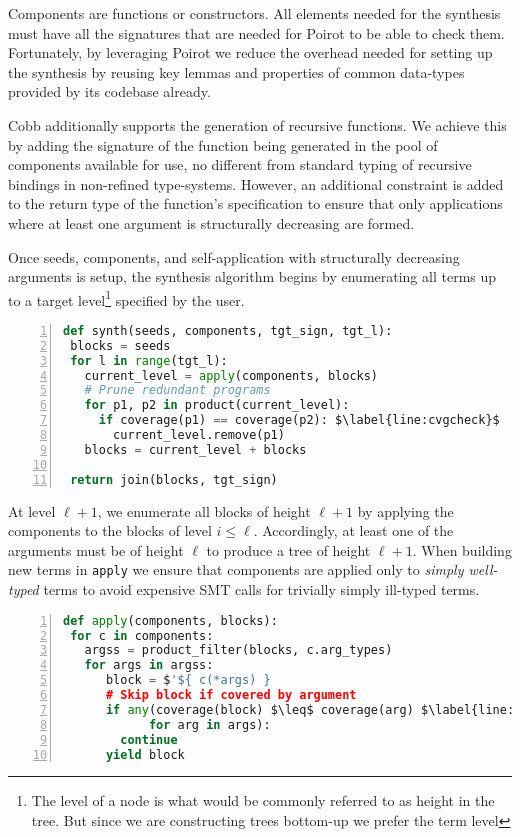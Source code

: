 \documentclass[review, sigplan]{acmart}
\begin{document}
Components are functions or constructors.
All elements needed for the synthesis must have all the signatures
that are needed for Poirot to be able to check them.
Fortunately, by leveraging Poirot we reduce the overhead needed for setting
up the synthesis by reusing key lemmas and properties of common
data-types provided by its codebase already.

Cobb additionally supports the generation of recursive functions.
We achieve this by adding the signature of the function being
generated in the pool of components available for use,
no different from standard typing of recursive bindings in non-refined
type-systems.
However, an additional constraint is added to the return type
of the function's specification to ensure that only applications
where at least one argument is structurally decreasing are formed.

Once seeds, components, and self-application with structurally decreasing
arguments is setup, the synthesis algorithm begins by enumerating
all terms up to a target level\footnote{The level of a node is what would
  be commonly referred to as height in the tree. But since
  we are constructing trees bottom-up we prefer the term level} specified by the user.
\begin{lstlisting}[language=Python, basicstyle=\small\ttfamily, mathescape, numbers=left, numbersep=3pt]
def synth(seeds, components, tgt_sign, tgt_l):
 blocks = seeds
 for l in range(tgt_l):
   current_level = apply(components, blocks)
   # Prune redundant programs
   for p1, p2 in product(current_level):
     if coverage(p1) == coverage(p2): $\label{line:cvgcheck}$
       current_level.remove(p1)
   blocks = current_level + blocks

 return join(blocks, tgt_sign)
\end{lstlisting}
At level $\ell + 1$, we enumerate all blocks of height $\ell + 1$ by applying
the components to the blocks of level $i \leq \ell$.
Accordingly, at least one of the arguments must be of height $\ell$ to produce
a tree of height $\ell + 1$.
When building new terms in \lstinline[basicstyle=\small\ttfamily]|apply|
we ensure that components are applied only to \emph{simply well-typed} terms
to avoid expensive SMT calls for trivially simply ill-typed terms.

\begin{lstlisting}[language=Python, basicstyle=\small\ttfamily, mathescape, numbers=left, numbersep=3pt]
def apply(components, blocks):
 for c in components:
   argss = product_filter(blocks, c.arg_types)
   for args in argss:
      block = $'${ c(*args) }
      # Skip block if covered by argument
      if any(coverage(block) $\leq$ coverage(arg) $\label{line:cvginc}$
            for arg in args):
        continue
      yield block
\end{lstlisting}
\end{document}
